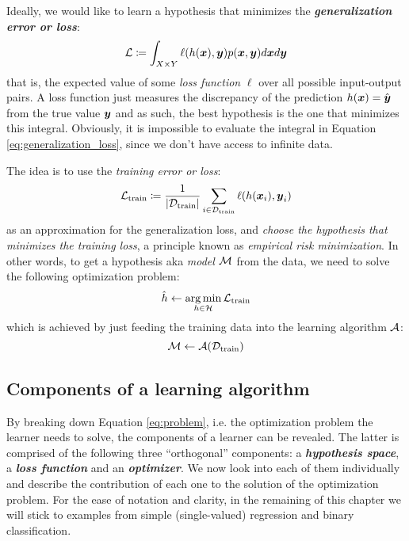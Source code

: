 Ideally, we would like to learn a hypothesis that minimizes the
\emph{\textbf{generalization error or loss}}:
\begin{equation}
	\label{eq:generalization_loss}
	\mathcal{L} \coloneqq \int_{X \times Y} \ell(h(\boldsymbol{x}), \boldsymbol{y}) p(\boldsymbol{x}, \boldsymbol{y}) d\boldsymbol{x} d\boldsymbol{y}
\end{equation}
that is, the expected value of some \emph{loss function}
$\ell$ over all possible input-output pairs. A loss function just measures the
discrepancy of the prediction $h(\boldsymbol{x}) = \hat{\boldsymbol{y}}$ from the true value $\boldsymbol{y}$
and as such, the best hypothesis is the one that minimizes this integral.
Obviously, it is impossible to evaluate the integral in Equation
\ref{eq:generalization_loss}, since we don't have access to infinite data.

The idea is to use the \emph{training error or loss}:
\begin{equation}
	\label{eq:training_loss}
	\mathcal{L}_\text{train} \coloneqq \frac{1}{\lvert \mathcal{D}_\text{train} \rvert} \sum_{i \in \mathcal{D}_\text{train}}
	\ell(h(\boldsymbol{x}_i), \boldsymbol{y}_i)
\end{equation}
as an approximation for the generalization loss, and \emph{choose the hypothesis
that minimizes the training loss}, a principle known as \emph{empirical risk
minimization}. In other words, to get a
hypothesis aka \emph{model} $\mathcal{M}$ from the data, we need to
solve the following optimization problem:
\begin{equation}
	\label{eq:problem}
	\hat{h} \gets \operatorname*{arg\,min}_{h \in \mathcal{H}} \mathcal{L}_\text{train}
\end{equation}
which is achieved by just feeding the training data into the learning
algorithm $\mathcal{A}$:
\begin{equation}
	\label{eq:learner}
	\mathcal{M} \gets \mathcal{A}(\mathcal{D}_\text{train})
\end{equation}

\subsection{Components of a learning algorithm}

By breaking down Equation \ref{eq:problem}, i.e. the optimization problem the
learner needs to solve, the components of a learner can be revealed. The latter
is comprised of the following three ``orthogonal'' components: a
\emph{\textbf{hypothesis space}}, a \emph{\textbf{loss
function}} and an \emph{\textbf{optimizer}}. We now look into each of them
individually and describe the contribution of each one to the solution of the
optimization problem. For the ease of notation and clarity, in the remaining of
this chapter we will stick to examples from simple (single-valued) regression
and binary classification.

